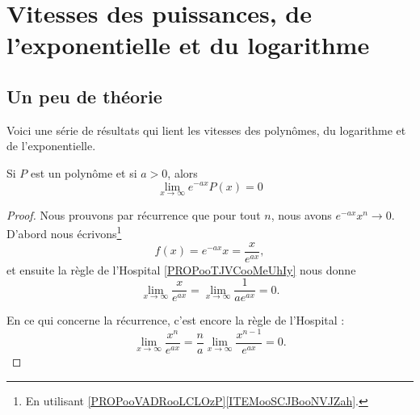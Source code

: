 \section{Vitesses des puissances, de l'exponentielle et du logarithme}

\subsection{Un peu de théorie}

Voici une série de résultats qui lient les vitesses des polynômes, du logarithme et de l'exponentielle.

\begin{lemma}       \label{LEMooNYFVooXjFShk}
	Si \( P\) est un polynôme et si \( a>0\), alors
	\begin{equation}
		\lim_{x\to \infty}  e^{-ax}P(x)=0
	\end{equation}
\end{lemma}

\begin{proof}
	Nous prouvons par récurrence que pour tout \( n\), nous avons \(  e^{-ax}x^n\to 0\). D'abord nous écrivons\footnote{En utilisant \ref{PROPooVADRooLCLOzP}\ref{ITEMooSCJBooNVJZah}.}
	\begin{equation}
		f(x)= e^{-ax}x=\frac{ x }{  e^{ax} },
	\end{equation}
	et ensuite la règle de l'Hospital \ref{PROPooTJVCooMeUhIy} nous donne
	\begin{equation}
		\lim_{x\to \infty} \frac{ x }{  e^{ax} }=\lim_{x\to \infty} \frac{1}{ a e^{ax} }=0.
	\end{equation}

	En ce qui concerne la récurrence, c'est encore la règle de l'Hospital :
	\begin{equation}
		\lim_{x\to \infty} \frac{ x^n }{  e^{ax} }=\frac{ n }{ a }\lim_{x\to \infty} \frac{ x^{n-1} }{  e^{ax} }=0.
	\end{equation}
\end{proof}

